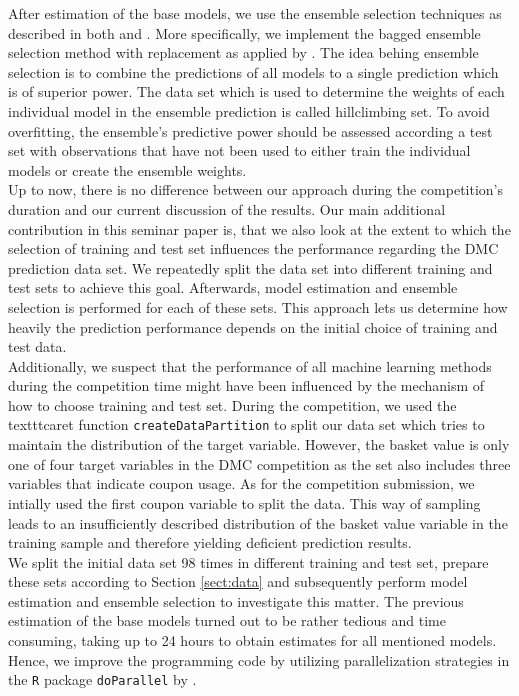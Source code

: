 \documentclass[12pt]{article}
\begin{document}
After estimation of the base models, we use the ensemble selection techniques as described in both \cite{Caruana2006} and \cite{Caruana04}. More specifically, we implement the bagged ensemble selection method with replacement as applied by \cite{Caruana04}. The idea behing ensemble selection is to combine the predictions of all models to a single prediction which is of superior power. The data set which is used to determine the weights of each individual model in the ensemble prediction is called hillclimbing set. To avoid overfitting, the ensemble's predictive power should be assessed according a test set with observations that have not been used to either train the individual models or create the ensemble weights.\\

Up to now, there is no difference between our approach during the competition's duration and our current discussion of the results. Our main additional contribution in this seminar paper is, that we also look at the extent to which the selection of training and test set influences the performance regarding the DMC prediction data set. We repeatedly split the data set into different training and test sets to achieve this goal. Afterwards, model estimation and ensemble selection is performed for each of these sets.
This approach lets us determine how heavily the prediction performance depends on the initial choice of training and test data.  \\

Additionally, we suspect that the performance of all machine learning methods during the competition time might have been influenced by the mechanism of how to choose training and test set. During the competition, we used the texttt{caret} function \texttt{createDataPartition} to split our data set which tries to maintain the distribution of the target variable.
However, the basket value is only one of four target variables in the DMC competition as the set also includes three variables that indicate coupon usage. As for the competition submission, we intially used the first coupon variable to split the data. This way of sampling leads to an insufficiently described distribution of the basket value variable in the training sample and therefore yielding deficient prediction results. \\

We split the initial data set 98 times in different training and test set, prepare these sets according to Section \ref{sect:data} and subsequently perform model estimation and ensemble selection to investigate this matter. The previous estimation of the base models turned out to be rather tedious and time consuming, taking up to 24 hours to obtain estimates for all mentioned models. Hence, we improve the programming code by utilizing parallelization strategies in the \texttt{R} package \texttt{doParallel} by \cite{doParallel}.
\end{document}
